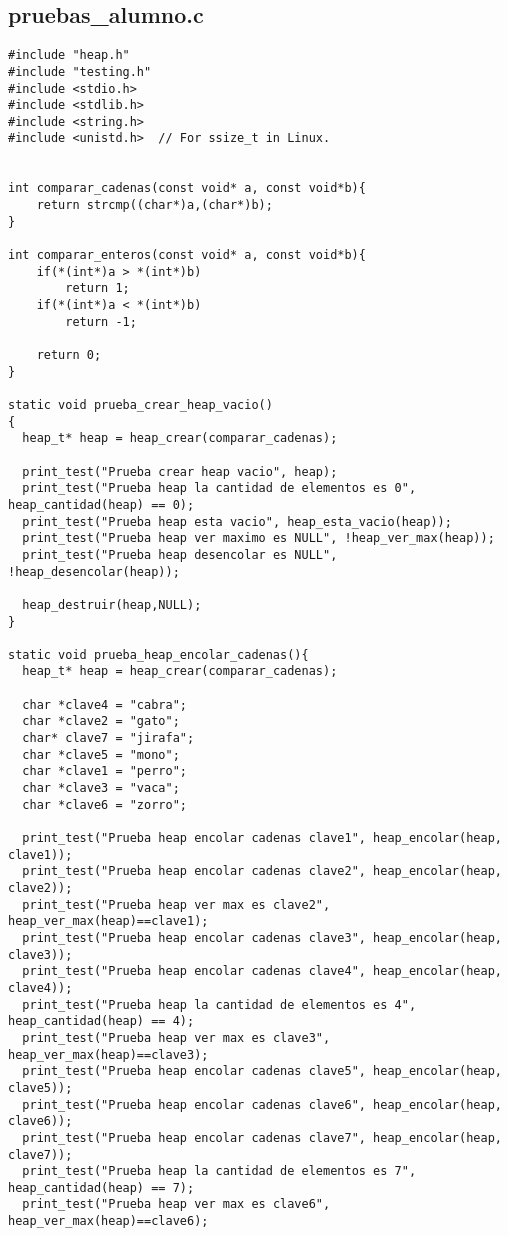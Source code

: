 \documentclass[11pt,a4paper]{article}
\begin{document}
 \subsection{pruebas\_alumno.c}
\begin{lstlisting}[style= c]
#include "heap.h"
#include "testing.h"
#include <stdio.h>
#include <stdlib.h>
#include <string.h>
#include <unistd.h>  // For ssize_t in Linux.


int comparar_cadenas(const void* a, const void*b){
    return strcmp((char*)a,(char*)b);
}

int comparar_enteros(const void* a, const void*b){
	if(*(int*)a > *(int*)b)
		return 1;
	if(*(int*)a < *(int*)b)
		return -1;

	return 0;
}

static void prueba_crear_heap_vacio()
{
  heap_t* heap = heap_crear(comparar_cadenas);

  print_test("Prueba crear heap vacio", heap);
  print_test("Prueba heap la cantidad de elementos es 0", heap_cantidad(heap) == 0);
  print_test("Prueba heap esta vacio", heap_esta_vacio(heap));
  print_test("Prueba heap ver maximo es NULL", !heap_ver_max(heap));
  print_test("Prueba heap desencolar es NULL", !heap_desencolar(heap));

  heap_destruir(heap,NULL);
}

static void prueba_heap_encolar_cadenas(){
  heap_t* heap = heap_crear(comparar_cadenas);

  char *clave4 = "cabra";
  char *clave2 = "gato";
  char* clave7 = "jirafa";
  char *clave5 = "mono";
  char *clave1 = "perro";
  char *clave3 = "vaca";
  char *clave6 = "zorro";
  
  print_test("Prueba heap encolar cadenas clave1", heap_encolar(heap, clave1));
  print_test("Prueba heap encolar cadenas clave2", heap_encolar(heap, clave2));
  print_test("Prueba heap ver max es clave2", heap_ver_max(heap)==clave1);
  print_test("Prueba heap encolar cadenas clave3", heap_encolar(heap, clave3));
  print_test("Prueba heap encolar cadenas clave4", heap_encolar(heap, clave4));
  print_test("Prueba heap la cantidad de elementos es 4", heap_cantidad(heap) == 4);
  print_test("Prueba heap ver max es clave3", heap_ver_max(heap)==clave3);
  print_test("Prueba heap encolar cadenas clave5", heap_encolar(heap, clave5));
  print_test("Prueba heap encolar cadenas clave6", heap_encolar(heap, clave6));
  print_test("Prueba heap encolar cadenas clave7", heap_encolar(heap, clave7));
  print_test("Prueba heap la cantidad de elementos es 7", heap_cantidad(heap) == 7);
  print_test("Prueba heap ver max es clave6", heap_ver_max(heap)==clave6);


\end{lstlisting}
\end{document}
